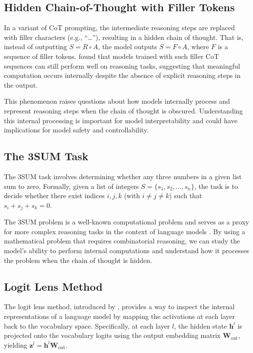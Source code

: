 \documentclass{article}
\begin{document}
\subsection{Hidden Chain-of-Thought with Filler Tokens}

In a variant of CoT prompting, the intermediate reasoning steps are replaced with filler characters (e.g., ``\ldots''), resulting in a hidden chain of thought. That is, instead of outputting $S = R \circ A$, the model outputs $S = F \circ A$, where $F$ is a sequence of filler tokens. \cite{pfau2023let} found that models trained with such filler CoT sequences can still perform well on reasoning tasks, suggesting that meaningful computation occurs internally despite the absence of explicit reasoning steps in the output.

This phenomenon raises questions about how models internally process and represent reasoning steps when the chain of thought is obscured. Understanding this internal processing is important for model interpretability and could have implications for model safety and controllability.

\subsection{The 3SUM Task}

The 3SUM task involves determining whether any three numbers in a given list sum to zero. Formally, given a list of integers $S = \{s_1, s_2, \dots, s_n\}$, the task is to decide whether there exist indices $i, j, k$ (with $i \ne j \ne k$) such that $s_i + s_j + s_k = 0$.

The 3SUM problem is a well-known computational problem and serves as a proxy for more complex reasoning tasks in the context of language models \cite{pfau2023let}. By using a mathematical problem that requires combinatorial reasoning, we can study the model's ability to perform internal computations and understand how it processes the problem when the chain of thought is hidden.

\subsection{Logit Lens Method}

The logit lens method, introduced by \cite{nostalgebraist2020}, provides a way to inspect the internal representations of a language model by mapping the activations at each layer back to the vocabulary space. Specifically, at each layer $l$, the hidden state $\mathbf{h}^l$ is projected onto the vocabulary logits using the output embedding matrix $\mathbf{W}_{\text{out}}$, yielding $\mathbf{z}^l = \mathbf{h}^l \mathbf{W}_{\text{out}}$.
\end{document}
